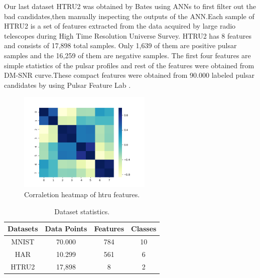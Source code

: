 \documentclass[journal]{IEEEtran}
\begin{document}
  Our last dataset HTRU2 was obtained by Bates\cite{bates2012high} using ANNs to first filter out the bad candidates,then manually inspecting the outputs of the ANN.Each sample of HTRU2 is a set of features extracted from the data acquired by large radio telescopes during High Time Resolution Universe Survey. HTRU2 has 8 features and consists of 17,898 total samples. Only 1,639 of them are positive pulsar samples and the 16,259 of them are negative samples. The first four features are simple statistics of the pulsar profiles and rest of the features were obtained from DM-SNR curve\cite{keith2010high}.These compact features were obtained from 90.000 labeled pulsar candidates by using Pulsar Feature Lab \cite{Lyon2015}.

  \begin{figure}[!ht]
    \centering
    \includegraphics[width=2.5in]{images/cor_heat_htru.png}
    \caption{Corraletion heatmap of htru features.}
    \label{fig_htru}
    \end{figure}
    \par
  
  \begin{table}[!ht]
  \renewcommand{\arraystretch}{1.3}
  \caption{Dataset statistics.}
  \label{tab_datasets}
  \centering
  \begin{tabular}{|c||c|c|c|}
  \hline
  Datasets &    Data Points &  Features &  Classes \\
  \hline
  \hline
  MNIST &    70.000 &   784 &                 10 \\
  \hline
  HAR &       10.299 &   561 &                 6 \\
  \hline
  HTRU2 &    17,898 &   8 &                  2 \\
  \hline
  \end{tabular}
  \end{table}
\end{document}
